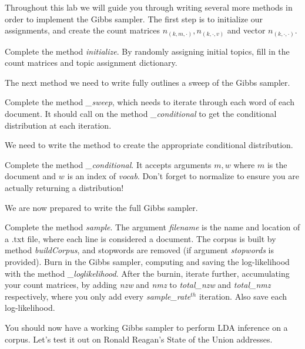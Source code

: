 Throughout this lab we will guide you through writing several more methods in order to implement the Gibbs sampler. The first step is to initialize our assignments, and create the count matrices $n_{(k,m,\cdot)}, n_{(k,\cdot,v)}$ and vector $n_{(k,\cdot,\cdot)}$.

\begin{problem}
Complete the method \emph{initialize}. By randomly assigning initial topics, fill in the count matrices and topic assignment dictionary.
\end{problem}

The next method we need to write fully outlines a sweep of the Gibbs sampler.

\begin{problem}
Complete the method \emph{\_sweep}, which needs to iterate through each word of each document. It should call on the method \emph{\_conditional} to get the conditional distribution at each iteration.
\end{problem}

We need to write the method to create the appropriate conditional distribution.

\begin{problem}
Complete the method \emph{\_conditional}. It accepts arguments $m,w$ where $m$ is the document and $w$ is an index of \emph{vocab}. Don't forget to normalize to ensure you are actually returning a distribution!
\end{problem}

We are now prepared to write the full Gibbs sampler.

\begin{problem}
Complete the method \emph{sample}. The argument \emph{filename} is the name and location of a .txt file, where each line is considered a document. The corpus is built by method \emph{buildCorpus}, and stopwords are removed (if argument \emph{stopwords} is provided). Burn in the Gibbs sampler, computing and saving the log-likelihood with the method \emph{\_loglikelihood}. After the burnin, iterate further, accumulating your count matrices, by adding \emph{nzw} and \emph{nmz} to \emph{total\_nzw} and \emph{total\_nmz} respectively, where you only add every \emph{sample\_rate}$^{th}$ iteration. Also save each log-likelihood.
\end{problem}

You should now have a working Gibbs sampler to perform LDA inference on a corpus. Let's test it out on Ronald Reagan's State of the Union addresses.

